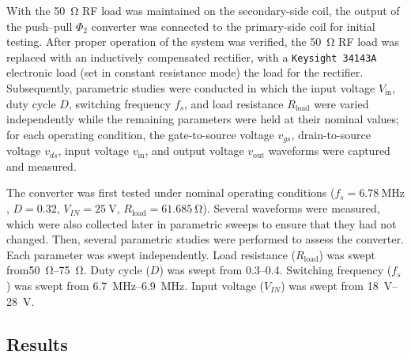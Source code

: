 \documentclass[journal, 9pt, letterpaper, english]{IEEEtran}[2015/08/26]
\begin{document}
With the \qty{50}{\ohm} RF load was maintained on the secondary-side coil, the output of the push--pull $\Phi_2$ converter was connected to the primary-side coil for initial testing. After proper operation of the system was verified, the \qty{50}{\ohm} RF load was replaced with an inductively compensated rectifier, with a \texttt{Keysight 34143A} electronic load (set in constant resistance mode) the load for the rectifier.
Subsequently, parametric studies were conducted in which the input voltage $V_{\mathrm{in}}$, duty cycle $D$, switching frequency $f_s$, and load resistance $R_\mathrm{load}$ were varied independently while the remaining parameters were held at their nominal values; for each operating condition, the gate-to-source voltage $v_{gs}$, drain-to-source voltage $v_{ds}$, input voltage $v_{\mathrm{in}}$, and output voltage $v_{\mathrm{out}}$ waveforms were captured and measured.

The converter was first tested under nominal operating conditions ($f_s=\qty{6.78}{\mega\hertz}$, $D=0.32$, $V_{IN}=\qty{25}{\volt}$, $R_\mathrm{load}=\qty{61.685}{\ohm}$). Several waveforms were measured, which were also collected later in parametric sweeps to ensure that they had not changed.
Then, several parametric studies were performed to assess the converter.
Each parameter was swept independently.
Load resistance ($R_\mathrm{load}$) was swept from\qtyrange{50}{75}{\ohm}.
Duty cycle ($D$) was swept from \numrange{0.3}{0.4}.
Switching frequency ($f_s$) was swept from \qtyrange{6.7}{6.9}{\mega\hertz}.
Input voltage ($V_{IN}$) was swept from \qtyrange{18}{28}{\volt}.

\FloatBarrier
\subsection{Results}
\label{sec:results}
\end{document}
